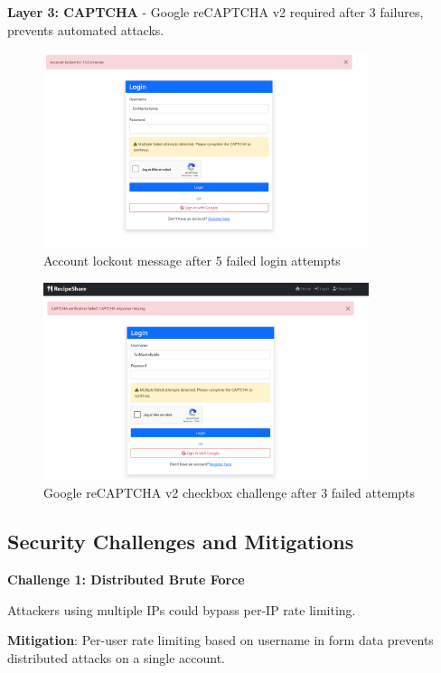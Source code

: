 \documentclass[12pt,a4paper]{article}
\begin{document}
\textbf{Layer 3: CAPTCHA} - Google reCAPTCHA v2 required after 3 failures, prevents automated attacks.

\begin{figure}[H]
    \centering
    \includegraphics[width=0.85\textwidth]{SCREENSHOTs/account locked.png}
    \caption{Account lockout message after 5 failed login attempts}
    \label{fig:lockout_screen}
\end{figure}

\begin{figure}[H]
    \centering
    \includegraphics[width=0.85\textwidth]{SCREENSHOTs/reCaptcha.png}
    \caption{Google reCAPTCHA v2 checkbox challenge after 3 failed attempts}
    \label{fig:captcha}
\end{figure}

\subsection{Security Challenges and Mitigations}

\textbf{Challenge 1: Distributed Brute Force}

Attackers using multiple IPs could bypass per-IP rate limiting.

\textbf{Mitigation}: Per-user rate limiting based on username in form data prevents distributed attacks on a single account.
\end{document}
